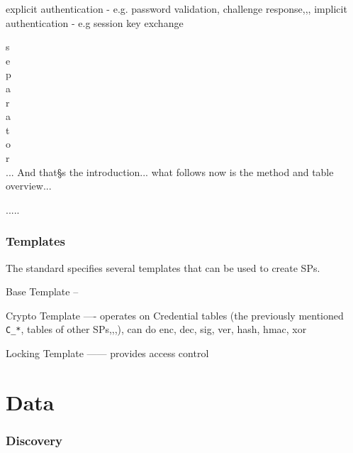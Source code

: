 \documentclass[
  digital, %
  oneside, %
  nolof,     %
  nolot,     %
]{fithesis4}
\begin{document}
explicit authentication - e.g. password validation, challenge response,,,
implicit authentication - e.g session key exchange




s \\
e \\
p \\
a \\
r \\
a \\
t \\
o \\
r \\

... And that§s the introduction... what follows now is the method and table overview...


.....

\subsection{Templates}

The standard specifies several templates that can be used to create SPs.


Base Template --

Crypto Template ---- operates on Credential tables (the previously mentioned \verb|C_*|, tables of other SPs,,,), can do enc, dec, sig, ver, hash, hmac, xor

Locking Template ------ provides access control







\chapter{Data}

\subsection{Discovery}
\end{document}
